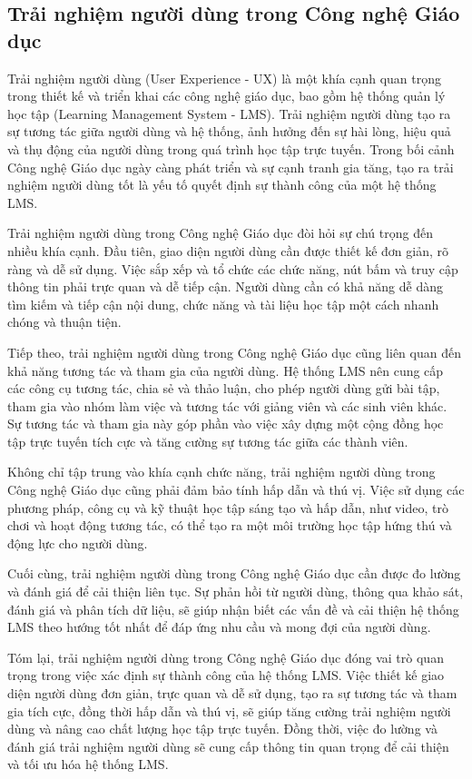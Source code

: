 \documentclass[../Thesis.tex]{subfiles}
\begin{document}
	\subsection{Trải nghiệm người dùng trong Công nghệ Giáo dục}
		Trải nghiệm người dùng (User Experience - UX) là một khía cạnh quan trọng trong thiết kế và triển khai các công nghệ giáo dục, bao gồm hệ thống quản lý học tập (Learning Management System - LMS). Trải nghiệm người dùng tạo ra sự tương tác giữa người dùng và hệ thống, ảnh hưởng đến sự hài lòng, hiệu quả và thụ động của người dùng trong quá trình học tập trực tuyến. Trong bối cảnh Công nghệ Giáo dục ngày càng phát triển và sự cạnh tranh gia tăng, tạo ra trải nghiệm người dùng tốt là yếu tố quyết định sự thành công của một hệ thống LMS.

		Trải nghiệm người dùng trong Công nghệ Giáo dục đòi hỏi sự chú trọng đến nhiều khía cạnh. Đầu tiên, giao diện người dùng cần được thiết kế đơn giản, rõ ràng và dễ sử dụng. Việc sắp xếp và tổ chức các chức năng, nút bấm và truy cập thông tin phải trực quan và dễ tiếp cận. Người dùng cần có khả năng dễ dàng tìm kiếm và tiếp cận nội dung, chức năng và tài liệu học tập một cách nhanh chóng và thuận tiện.

		Tiếp theo, trải nghiệm người dùng trong Công nghệ Giáo dục cũng liên quan đến khả năng tương tác và tham gia của người dùng. Hệ thống LMS nên cung cấp các công cụ tương tác, chia sẻ và thảo luận, cho phép người dùng gửi bài tập, tham gia vào nhóm làm việc và tương tác với giảng viên và các sinh viên khác. Sự tương tác và tham gia này góp phần vào việc xây dựng một cộng đồng học tập trực tuyến tích cực và tăng cường sự tương tác giữa các thành viên.

		Không chỉ tập trung vào khía cạnh chức năng, trải nghiệm người dùng trong Công nghệ Giáo dục cũng phải đảm bảo tính hấp dẫn và thú vị. Việc sử dụng các phương pháp, công cụ và kỹ thuật học tập sáng tạo và hấp dẫn, như video, trò chơi và hoạt động tương tác, có thể tạo ra một môi trường học tập hứng thú và động lực cho người dùng.

		Cuối cùng, trải nghiệm người dùng trong Công nghệ Giáo dục cần được đo lường và đánh giá để cải thiện liên tục. Sự phản hồi từ người dùng, thông qua khảo sát, đánh giá và phân tích dữ liệu, sẽ giúp nhận biết các vấn đề và cải thiện hệ thống LMS theo hướng tốt nhất để đáp ứng nhu cầu và mong đợi của người dùng.

		Tóm lại, trải nghiệm người dùng trong Công nghệ Giáo dục đóng vai trò quan trọng trong việc xác định sự thành công của hệ thống LMS. Việc thiết kế giao diện người dùng đơn giản, trực quan và dễ sử dụng, tạo ra sự tương tác và tham gia tích cực, đồng thời hấp dẫn và thú vị, sẽ giúp tăng cường trải nghiệm người dùng và nâng cao chất lượng học tập trực tuyến. Đồng thời, việc đo lường và đánh giá trải nghiệm người dùng sẽ cung cấp thông tin quan trọng để cải thiện và tối ưu hóa hệ thống LMS.
\end{document}
